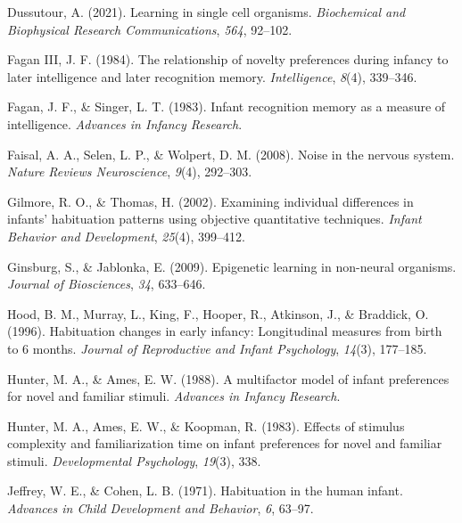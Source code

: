 \documentclass[10pt, letterpaper]{article}
\newenvironment{CSLReferences}%
  {}%
  {\par}
\begin{document}
\begin{CSLReferences}{1}{0}
\leavevmode{}%
Dussutour, A. (2021). Learning in single cell organisms.
\emph{Biochemical and Biophysical Research Communications}, \emph{564},
92--102.

\leavevmode{}%
Fagan III, J. F. (1984). The relationship of novelty preferences during
infancy to later intelligence and later recognition memory.
\emph{Intelligence}, \emph{8}(4), 339--346.

\leavevmode{}%
Fagan, J. F., \& Singer, L. T. (1983). Infant recognition memory as a
measure of intelligence. \emph{Advances in Infancy Research}.

\leavevmode{}%
Faisal, A. A., Selen, L. P., \& Wolpert, D. M. (2008). Noise in the
nervous system. \emph{Nature Reviews Neuroscience}, \emph{9}(4),
292--303.

\leavevmode{}%
Gilmore, R. O., \& Thomas, H. (2002). Examining individual differences
in infants' habituation patterns using objective quantitative
techniques. \emph{Infant Behavior and Development}, \emph{25}(4),
399--412.

\leavevmode{}%
Ginsburg, S., \& Jablonka, E. (2009). Epigenetic learning in non-neural
organisms. \emph{Journal of Biosciences}, \emph{34}, 633--646.

\leavevmode{}%
Hood, B. M., Murray, L., King, F., Hooper, R., Atkinson, J., \&
Braddick, O. (1996). Habituation changes in early infancy: Longitudinal
measures from birth to 6 months. \emph{Journal of Reproductive and
Infant Psychology}, \emph{14}(3), 177--185.

\leavevmode{}%
Hunter, M. A., \& Ames, E. W. (1988). A multifactor model of infant
preferences for novel and familiar stimuli. \emph{Advances in Infancy
Research}.

\leavevmode{}%
Hunter, M. A., Ames, E. W., \& Koopman, R. (1983). Effects of stimulus
complexity and familiarization time on infant preferences for novel and
familiar stimuli. \emph{Developmental Psychology}, \emph{19}(3), 338.

\leavevmode{}%
Jeffrey, W. E., \& Cohen, L. B. (1971). Habituation in the human infant.
\emph{Advances in Child Development and Behavior}, \emph{6}, 63--97.


\end{CSLReferences}
\end{document}
